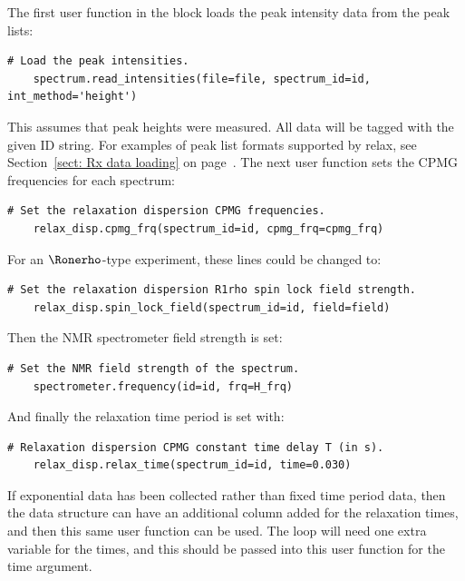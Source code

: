 The first user function in the block loads the peak intensity data from the peak lists:

\begin{lstlisting}[firstnumber=89]
    # Load the peak intensities.
    spectrum.read_intensities(file=file, spectrum_id=id, int_method='height')
\end{lstlisting}

This assumes that peak heights were measured.  All data will be tagged with the given ID string.  For examples of peak list formats supported by relax, see Section~\ref{sect: Rx data loading} on page~\pageref{sect: Rx data loading}.  The next user function sets the CPMG frequencies for each spectrum:

\begin{lstlisting}[firstnumber=92]
    # Set the relaxation dispersion CPMG frequencies.
    relax_disp.cpmg_frq(spectrum_id=id, cpmg_frq=cpmg_frq)
\end{lstlisting}

For an $\Ronerho$-type experiment, these lines could be changed to:

\begin{lstlisting}[numbers=none]
    # Set the relaxation dispersion R1rho spin lock field strength.
    relax_disp.spin_lock_field(spectrum_id=id, field=field)
\end{lstlisting}

Then the NMR spectrometer field strength is set:

\begin{lstlisting}[firstnumber=95]
    # Set the NMR field strength of the spectrum.
    spectrometer.frequency(id=id, frq=H_frq)
\end{lstlisting}

And finally the relaxation time period is set with:

\begin{lstlisting}[firstnumber=98]
    # Relaxation dispersion CPMG constant time delay T (in s).
    relax_disp.relax_time(spectrum_id=id, time=0.030)
\end{lstlisting}

If exponential data has been collected rather than fixed time period data, then the  data structure can have an additional column added for the relaxation times, and then this same user function can be used.  The  loop will need one extra variable for the times, and this should be passed into this  user function for the time argument.

